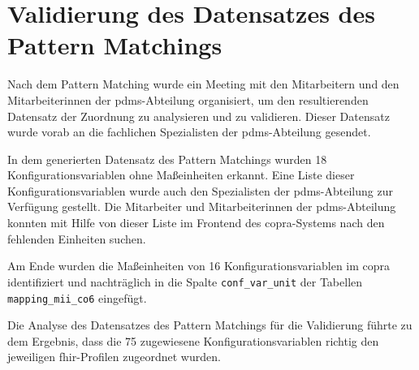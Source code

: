 \section{Validierung des Datensatzes des Pattern Matchings } \label{sec:validmethode}

Nach dem Pattern Matching wurde ein Meeting mit den Mitarbeitern und den Mitarbeiterinnen der \ac{pdms}-Abteilung organisiert, um den resultierenden Datensatz der Zuordnung zu analysieren und zu validieren. Dieser Datensatz wurde vorab an die fachlichen Spezialisten der \ac{pdms}-Abteilung gesendet.

In dem generierten Datensatz des Pattern Matchings wurden 18 Konfigurationsvariablen ohne Maßeinheiten erkannt. Eine Liste dieser Konfigurationsvariablen wurde auch den Spezialisten der \ac{pdms}-Abteilung zur Verfügung gestellt. Die Mitarbeiter und Mitarbeiterinnen der \ac{pdms}-Abteilung konnten mit Hilfe von dieser Liste im Frontend des \ac{copra}-Systems nach den fehlenden Einheiten suchen.

Am Ende wurden die Maßeinheiten von 16 Konfigurationsvariablen im \ac{copra} identifiziert und nachträglich in die Spalte \texttt{conf\_var\_unit} der Tabellen \texttt{mapping\_mii\_co6} eingefügt.

Die Analyse des Datensatzes des Pattern Matchings für die Validierung führte zu dem Ergebnis, dass die 75 zugewiesene Konfigurationsvariablen richtig den jeweiligen \ac{fhir}-Profilen zugeordnet wurden.